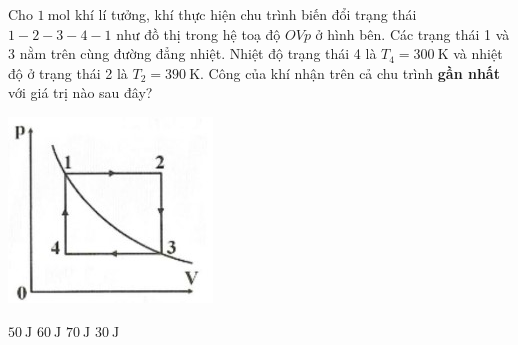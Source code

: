 \begin{ex}
Cho $\SI{1}{\mole}$ khí lí tưởng, khí thực hiện chu trình biến đổi trạng thái  $1-2-3-4-1$ như đồ thị trong hệ toạ độ $OVp$ ở hình bên. Các trạng thái 1 và 3 nằm trên cùng đường đẳng nhiệt. Nhiệt độ trạng thái 4 là $T_4=\SI{300}{\kelvin}$ và nhiệt độ ở trạng thái 2 là $T_2=\SI{390}{\kelvin}$. Công của khí nhận trên cả chu trình \textbf{gần nhất} với giá trị nào sau đây?
\begin{center}
	\includegraphics[width=0.3\linewidth]{figs/VN12-Y24-PH-SYL-015P-5}
\end{center}
	
	\choice
	{\True $\SI{50}{\joule}$}
	{$\SI{60}{\joule}$}
	{$\SI{70}{\joule}$}
	{$\SI{30}{\joule}$}
\end{ex}
